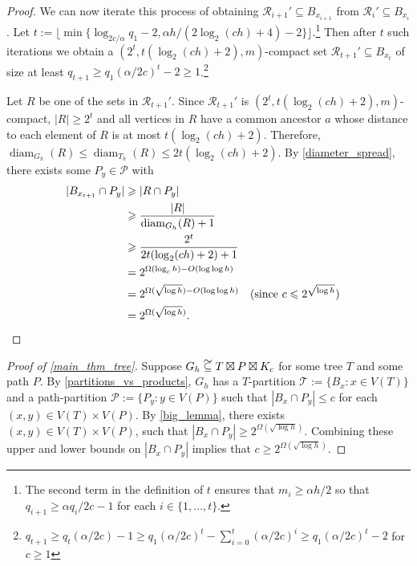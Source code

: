 \documentclass{patmorin}
\DeclareMathOperator{\diam}{diam}
\newcommand\subsetcong{\mathrel{\text{%
    \setbox0\hbox{$\subseteq$}%
    \rlap{\hbox to \wd0{\hss\hss\hss\raisebox{1.5\height}{$\sim$}\hss}}\box0
}}}
\renewcommand{\le}{\leqslant}
\renewcommand{\ge}{\geqslant}
\begin{document}
\begin{proof}
  We can now iterate this process of obtaining $\mathcal{R}_{i+1}'\subseteq B_{x_{i+1}}$ from $\mathcal{R}_i'\subseteq B_{x_i}$. Let $t:= \lfloor \min\{\log_{2c/\alpha} q_1-2,\alpha h/(2\log_2(ch)+4)-2\}\rfloor$.\footnote{The second term in the definition of $t$ ensures that $m_i\ge \alpha h/2$ so that $q_{i+1}\ge \alpha q_i/2c-1$ for each $i\in\{1,\ldots,t\}$.} Then after $t$ such iterations we obtain a $(2^t,t(\log_2(ch)+2),m)$-compact set $\mathcal{R}_{t+1}'\subseteq B_{x_t}$ of size at least $q_{t+1} \ge q_1(\alpha/2c)^t-2 \ge 1$.\footnote{$q_{t+1} \ge q_t(\alpha/2c) - 1 \ge q_1(\alpha/2c)^t - \sum_{i=0}^t (\alpha/2c)^i \ge q_1(\alpha/2c)^t - 2$ for $c\ge 1$}

  Let $R$ be one of the sets in $\mathcal{R}_{t+1}'$.  Since $\mathcal{R}_{t+1}'$ is $(2^t,t(\log_2(ch)+2),m)$-compact, $|R|\ge 2^t$   and all vertices in $R$ have a common ancestor $a$ whose distance to each element of $R$ is at most $t(\log_2(ch)+2)$.  Therefore, $\diam_{G_h}(R)\le\diam_{T_h}(R)\le 2t(\log_2(ch)+2)$. By \cref{diameter_spread}, there exists some $P_y\in\mathcal{P}$ with
  \begin{align*}
    |B_{x_{t+1}}\cap P_y|
    & \ge |R\cap P_y| \\
    & \ge \frac{|R|}{\diam_{G_h}(R)+1} \\
    & \ge \frac{2^t}{2t(\log_2(ch)+2)+1} \\
    & = 2^{\Omega(\log_{c} h)-O(\log\log h)} \\
    & = 2^{\Omega(\sqrt{\log h})-O(\log\log h)} & \text{(since $c\le 2^{\sqrt{\log h}}$)}\\
    & = 2^{\Omega(\sqrt{\log h})} . & & \qedhere
  \end{align*}
\end{proof}

\begin{proof}[Proof of \cref{main_thm_tree}]
  Suppose $G_h\subsetcong T\boxtimes P\boxtimes K_c$ for some tree $T$ and some path $P$.  By \cref{partitions_vs_products}, $G_h$ has a $T$-partition $\mathcal{T}:=\{B_x:x\in V(T)\}$ and a path-partition $\mathcal{P}:=\{P_y:y\in V(P)\}$ such that $|B_x\cap P_y|\le c$ for each $(x,y)\in V(T)\times V(P)$.  By \cref{big_lemma}, there exists $(x,y)\in V(T)\times V(P)$, such that $|B_x\cap P_y| \ge 2^{\Omega(\sqrt{\log h})}$.  Combining these upper and lower bounds on $|B_x\cap P_y|$ implies that $c\ge 2^{\Omega(\sqrt{\log h})}$.
\end{proof}
\end{document}
